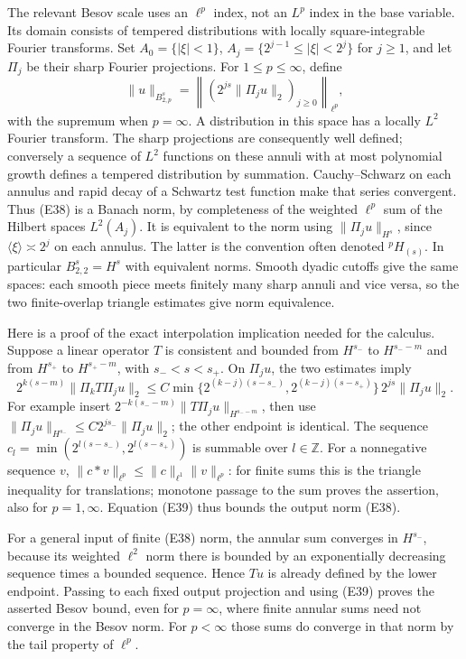 \documentclass[
  11pt,
]{article}
\begin{document}
The relevant Besov scale uses an \(\ell^p\) index, not an \(L^p\) index
in the base variable. Its domain consists of tempered distributions with
locally square-integrable Fourier transforms. Set \(A_0=\{|\xi|<1\}\),
\(A_j=\{2^{j-1}\leq|\xi|<2^j\}\) for \(j\geq1\), and let \(\Pi_j\) be
their sharp Fourier projections. For \(1\leq p\leq\infty\), define \[
\|u\|_{B^s_{2,p}}=
\left\|(2^{js}\|\Pi_ju\|_2)_{j\geq0}\right\|_{\ell^p},
\tag{E38}
\] with the supremum when \(p=\infty\). A distribution in this space has
a locally \(L^2\) Fourier transform. The sharp projections are
consequently well defined; conversely a sequence of \(L^2\) functions on
these annuli with at most polynomial growth defines a tempered
distribution by summation. Cauchy--Schwarz on each annulus and rapid
decay of a Schwartz test function make that series convergent. Thus
(E38) is a Banach norm, by completeness of the weighted \(\ell^p\) sum
of the Hilbert spaces \(L^2(A_j)\). It is equivalent to the norm using
\(\|\Pi_ju\|_{H^s}\), since \(\langle\xi\rangle\asymp2^j\) on each
annulus. The latter is the convention often denoted \({}^pH_{(s)}\). In
particular \(B^s_{2,2}=H^s\) with equivalent norms. Smooth dyadic
cutoffs give the same spaces: each smooth piece meets finitely many
sharp annuli and vice versa, so the two finite-overlap triangle
estimates give norm equivalence.

Here is a proof of the exact interpolation implication needed for the
calculus. Suppose a linear operator \(T\) is consistent and bounded from
\(H^{s_-}\) to \(H^{s_--m}\) and from \(H^{s_+}\) to \(H^{s_+-m}\), with
\(s_-<s<s_+\). On \(\Pi_ju\), the two estimates imply \[
2^{k(s-m)}\|\Pi_kT\Pi_ju\|_2
\leq C\min\{2^{(k-j)(s-s_-)},
2^{(k-j)(s-s_+)}\}\,
2^{js}\|\Pi_ju\|_2.
\tag{E39}
\] For example insert \(2^{-k(s_--m)}\|T\Pi_ju\|_{H^{s_--m}}\), then use
\(\|\Pi_ju\|_{H^{s_-}}\leq C2^{js_-}\|\Pi_ju\|_2\); the other endpoint
is identical. The sequence \(c_l=\min(2^{l(s-s_-)},2^{l(s-s_+)})\) is
summable over \(l\in\mathbb Z\). For a nonnegative sequence \(v\),
\(\|c*v\|_{\ell^p}\leq\|c\|_{\ell^1}\|v\|_{\ell^p}\): for finite sums
this is the triangle inequality for translations; monotone passage to
the sum proves the assertion, also for \(p=1,\infty\). Equation (E39)
thus bounds the output norm (E38).

For a general input of finite (E38) norm, the annular sum converges in
\(H^{s_-}\), because its weighted \(\ell^2\) norm there is bounded by an
exponentially decreasing sequence times a bounded sequence. Hence \(Tu\)
is already defined by the lower endpoint. Passing to each fixed output
projection and using (E39) proves the asserted Besov bound, even for
\(p=\infty\), where finite annular sums need not converge in the Besov
norm. For \(p<\infty\) those sums do converge in that norm by the tail
property of \(\ell^p\).
\end{document}
